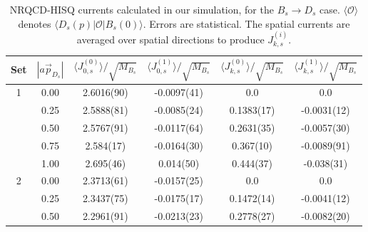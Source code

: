 \begin{table}
\begin{center}
\begin{tabular}{ c c c c c c }
\hline
Set & $| a\vec{p}_{D_s} |$ & $\langle J_{0,s}^{(0)} \rangle / \sqrt{M_{B_s}}$& $\langle J_{0,s}^{(1)} \rangle / \sqrt{M_{B_s}}$& $\langle J_{k,s}^{(0)} \rangle / \sqrt{M_{B_s}}$& $\langle J_{k,s}^{(1)} \rangle / \sqrt{M_{B_s}}$\\ [0.5ex]
\hline
1 & 0.00 & 2.6016(90) & -0.0097(41) & 0.0 & 0.0 \\ [0.5ex] 
 & 0.25 & 2.5888(81) & -0.0085(24) & 0.1383(17) & -0.0031(12)\\ [0.5ex] 
 & 0.50 & 2.5767(91) & -0.0117(64) & 0.2631(35) & -0.0057(30)\\ [0.5ex] 
 & 0.75 & 2.584(17) & -0.0164(30) & 0.367(10) & -0.0089(91)\\ [0.5ex] 
 & 1.00 & 2.695(46) & 0.014(50) & 0.444(37) & -0.038(31)\\ [0.5ex]
 \hline 
2 & 0.00 & 2.3713(61) & -0.0157(25) & 0.0 & 0.0 \\ [0.5ex] 
 & 0.25 & 2.3437(75) & -0.0175(17) & 0.1472(14) & -0.0041(12)\\ [0.5ex] 
 & 0.50 & 2.2961(91) & -0.0213(23) & 0.2778(27) & -0.0082(20)\\ [0.5ex] 
\hline
\end{tabular}
\caption{NRQCD-HISQ currents calculated in our simulation, for the $B_s\to D_s$ case. $\langle\mathcal{O} \rangle$ denotes $\langle D_s(p) |\mathcal{O}| B_s(0) \rangle$. Errors are statistical. The spatial currents are averaged
over spatial directions to produce $J_{k,s}^{(i)}$. \label{table:fitresults2}}
\end{center}
\end{table}

